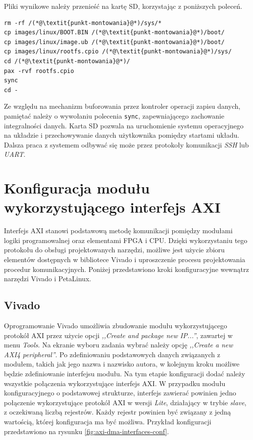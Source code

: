 Pliki wynikowe należy przenieść na kartę SD, korzystając z poniższych poleceń.

\begin{lstlisting}[breaklines=true]
rm -rf /(*@\textit{punkt-montowania}@*)/sys/*
cp images/linux/BOOT.BIN /(*@\textit{punkt-montowania}@*)/boot/
cp images/linux/image.ub /(*@\textit{punkt-montowania}@*)/boot/
cp images/linux/rootfs.cpio /(*@\textit{punkt-montowania}@*)/sys/
cd /(*@\textit{punkt-montowania}@*)/
pax -rvf rootfs.cpio
sync
cd -
\end{lstlisting}

Ze względu na mechanizm buforowania przez kontroler operacji zapisu danych, pamiętać należy o wywołaniu polecenia \texttt{sync}, zapewniającego zachowanie integralności danych.
Karta SD pozwala na uruchomienie systemu operacyjnego na układzie i przechowywanie danych użytkownika pomiędzy startami układu. 
Dalsza praca z systemem odbywać się może przez protokoły komunikacji \emph{SSH} lub \emph{UART}.

\section{Konfiguracja modułu wykorzystującego interfejs AXI}
\label{sec:vivado-axi-dma}

Interfejs AXI stanowi podstawową metodę komunikacji pomiędzy modułami logiki programowalnej oraz elementami FPGA i CPU. Dzięki wykorzystaniu tego protokołu do obsługi projektowanych narzędzi, możliwe jest użycie zbioru elementów dostępnych w bibliotece Vivado i uproszczenie procesu projektowania procedur komunikacyjnych. Poniżej przedstawiono kroki konfiguracyjne wewnątrz narzędzi Vivado i PetaLinux.

\subsection{Vivado}
Oprogramowanie Vivado umożliwia zbudowanie modułu wykorzystującego protokół AXI przez użycie opcji \emph{,,Create and package new IP...''}, zawartej w menu \emph{Tools}.
Na ekranie wyboru zadania wybrać należy opcję \emph{,,Create a new AXI4 peripheral''}.
Po zdefiniowaniu podstawowych danych związanych z modułem, takich jak jego nazwa i nazwisko autora, w kolejnym kroku możliwe będzie zdefiniowanie interfejsu modułu. 
Na tym etapie konfiguracji dodać należy wszystkie połączenia wykorzystujące interfejs AXI. %
W przypadku modułu konfiguracyjnego o podstawowej strukturze, interfejs zawierać powinien jedno połączenie wykorzystujące protokół AXI w wersji \emph{Lite}, działający w trybie \emph{slave}, z oczekiwaną liczbą rejestrów. 
Każdy rejestr powinien być związany z jedną wartością, której konfiguracja ma być możliwa. 
Przykład konfiguracji przedstawiono na rysunku \ref{fig:axi-dma-interfaces-conf}.

